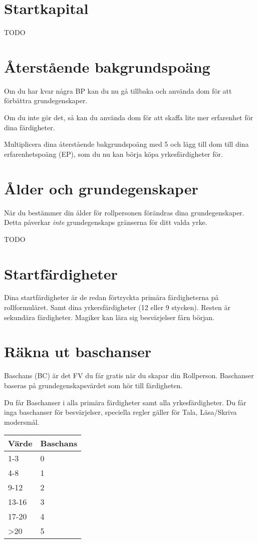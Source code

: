 \documentclass[a4paper, 10pt, titlepage]{article}
\begin{document}
\section{Startkapital}
TODO

\section{Återstående bakgrundspoäng}
Om du har kvar några BP kan du nu gå tillbaka och använda dom för att
förbättra grundegenskaper.

Om du inte gör det, så kan du använda dom för att skaffa lite mer erfarenhet
för dina färdigheter.

Multiplicera dina återstående bakgrundspoäng med 5 och lägg till dom till dina
erfarenhetspoäng (EP), som du nu kan börja köpa yrkesfärdigheter för.

\section{Ålder och grundegenskaper}

När du bestämmer din ålder för rollpersonen förändras dina grundegenskaper. Detta
påverkar \textit{inte}  grundegenskaps gränserna för ditt valda yrke.

TODO

\section{Startfärdigheter}
Dina startfärdigheter är de redan förtryckta primära färdigheterna på rollformuläret.
Samt dina yrkersfärdigheter (12 eller 9 stycken). Resten är sekundära färdigheter.
Magiker kan lära sig besvärjelser fårn början.

\section{Räkna ut baschanser}
Baschans (BC) är det FV du får gratis när du skapar din Rollperson. Baschanser baseras
på grundegenskapsvärdet som hör till färdigheten.

Du får Baschanser i alla primära färdigheter samt alla yrkesfärdigheter.
Du får inga baschanser för besvärjelser, speciella regler gäller för Tala,
Läsa/Skriva modersmål.

\begin{table}[hbp]
  \begin{tabular}{|l|l|}
    \hline
    Värde & Baschans \\
    \hline
    1-3   & 0 \\
    \hline
    4-8   & 1 \\
    \hline
    9-12  & 2 \\
    \hline
    13-16 & 3 \\
    \hline
    17-20 & 4 \\
    \hline
    >20   & 5 \\
    \hline
  \end{tabular}
\end{table}
\end{document}
